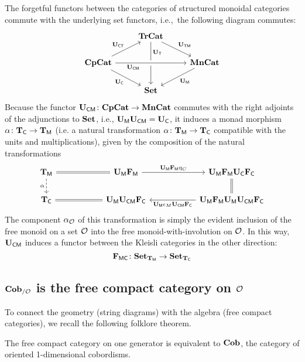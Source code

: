 \documentclass[11pt,oneside,article]{memoir}
\begin{document}
The forgetful functors between the categories of structured monoidal categories commute with the
underlying set functors, i.e.,~the following diagram commutes:
\begin{equation}
   \label{eqn:tetrahedron}
   \begin{tikzcd}
      & \TrCat \ar[dr,"\UTM"] \ar[dd,"\UT" near start] & \\
      \CompCat \ar[rr,crossing over,"\UCM"' near start] \ar[dr,"\UC"'] \ar[ru,"\UCT"]
         && \MonCat \ar[dl,"\UM"] \\
      & \Set &
   \end{tikzcd}
\end{equation}
Because the functor $\mathbf{U}_{\mathsf{CM}}\colon\mathbf{CpCat}\to\mathbf{MnCat}$ commutes with the right adjoints of the
adjunctions to $\mathbf{Set}$, i.e., $\mathbf{U}_{\mathsf{M}}\mathbf{U}_{\mathsf{CM}}=\mathbf{U}_{\mathsf{C}}$, it induces a monad morphism $\alpha\colon\mathbf{T}_{\mathsf{C}}\to\mathbf{T}_{\mathsf{M}}$
(i.e. a natural transformation $\alpha\colon\mathbf{T}_{\mathsf{M}}\to\mathbf{T}_{\mathsf{C}}$ compatible with the units and
multiplications), given by the composition of the natural transformations
\begin{equation*} \begin{tikzcd}[column sep=2cm]
   \TM\ar[r,equal]\ar[d,dashed,"\alpha"']&\UM\FM\ar[r,"\UM\FM\eta_C"]&\UM\FM\UC\FC\ar[d,equal]\\
   \TC&\UM\UCM\FC\ar[l,equal]&\UM\FM\UM\UCM\FC\ar[l,"\UM\epsilon_M\UCM\FC"]
\end{tikzcd} \end{equation*}
The component $\alpha_{\mathcal{O}}$ of this transformation is simply the evident inclusion of the free
monoid on a set $\mathcal{O}$ into the free monoid-with-involution on $\mathcal{O}$. In this way, $\mathbf{U}_{\mathsf{CM}}$
induces a functor between the Kleisli categories in the other direction:
\begin{equation}
      \label{eqn:FMC}
   \mathbf{F}_{\mathsf{MC}}\colon\mathbf{Set}_{\mathbf{T}_{\mathsf{M}}}\to\mathbf{Set}_{\mathbf{T}_{\mathsf{C}}}
\end{equation}

\subsection{$\mathbf{Cob}_{/\mathcal{O}}$ is the free compact category on $\mathcal{O}$}

To connect the geometry (string diagrams) with the algebra (free compact categories), we recall the
following folklore theorem.

\begin{theorem}
   The free compact category on one generator is equivalent to $\mathbf{Cob}$, the category of oriented
   1-dimensional cobordisms.
\end{theorem}
\end{document}
